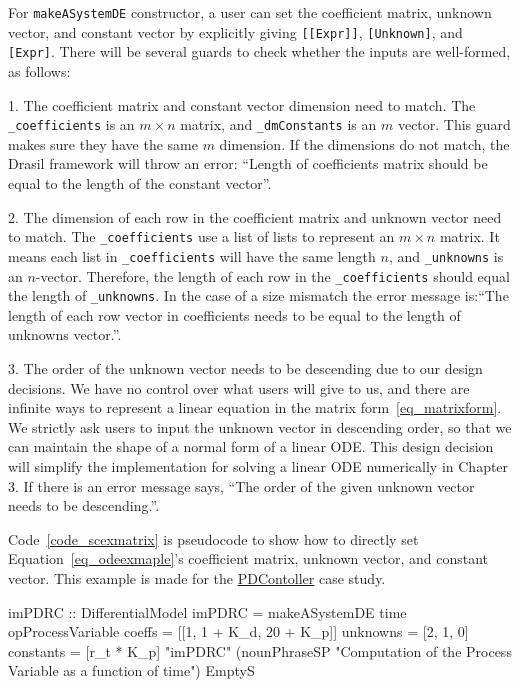 For \verb|makeASystemDE| constructor, a user can set the coefficient matrix, unknown vector, and constant vector by explicitly giving \verb|[[Expr]]|, \verb|[Unknown]|, and \verb|[Expr]|. There will be several guards to check whether the inputs are well-formed, as follows:

1. The coefficient matrix and constant vector dimension need to match. The \verb|_coefficients| is an $m \times n$ matrix, and \verb|_dmConstants| is an $m$ vector. This guard makes sure they have the same $m$ dimension. If the dimensions do not match, the Drasil framework will throw an error: ``Length of coefficients matrix should be equal to the length of the constant vector''.

2. The dimension of each row in the coefficient matrix and unknown vector need to match. The \verb|_coefficients| use a list of lists to represent an $m \times n$ matrix. It means each list in \verb|_coefficients| will have the same length $n$, and \verb|_unknowns| is an $n$-vector. Therefore, the length of each row in the \verb|_coefficients| should equal the length of \verb|_unknowns|. In the case of a size mismatch the error message is:``The length of each row vector in coefficients needs to be equal to the length of unknowns vector.''.

3. The order of the unknown vector needs to be descending due to our design decisions. We have no control over what users will give to us, and there are infinite ways to represent a linear equation in the matrix form~\ref{eq_matrixform}. We strictly ask users to input the unknown vector in descending order, so that we can maintain the shape of a normal form of a linear ODE. This design decision will simplify the implementation for solving a linear ODE numerically in Chapter 3. If there is an error message says, ``The order of the given unknown vector needs to be descending.''.

Code~\ref{code_scexmatrix} is pseudocode to show how to directly set Equation~\ref{eq_odeexmaple}'s coefficient matrix, unknown vector, and constant vector. This example is made for the \href{https://jacquescarette.github.io/Drasil/examples/pdcontroller/SRS/srs/PDController_SRS.html}{PDContoller} case study.

\begin{listing}[ht]
\begin{haskell1}
imPDRC :: DifferentialModel
imPDRC = makeASystemDE
	time
	opProcessVariable
	coeffs = [[1, 1 + K_d, 20 + K_p]]
	unknowns = [2, 1, 0]
	constants = [r_t * K_p]
	"imPDRC"
	(nounPhraseSP "Computation of the Process Variable as a function of time")
	EmptyS
\end{haskell1}
\label{code_scexmatrix}
\end{listing}

